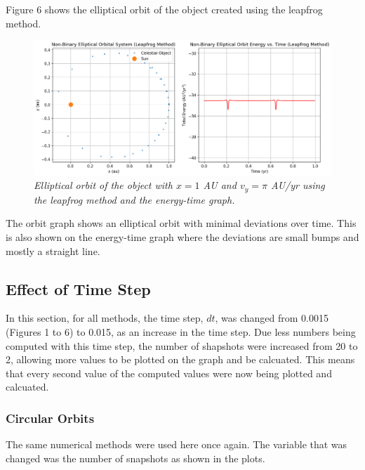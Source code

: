 \documentclass[11 pt, a4paper]{article}
\begin{document}
Figure 6 shows the elliptical orbit of the object created using the leapfrog method.
\begin{figure}[H]
  \includegraphics[width=1\linewidth]{Leapfrog/leapfrogelliptic.png}
  \centering
  \caption{\textit{Elliptical orbit of the object with $x = 1$ AU and $v_y = \pi$ AU/yr using the leapfrog method and the energy-time graph.}} 
\end{figure}
The orbit graph shows an elliptical orbit with minimal deviations over time. This is also shown on the energy-time graph where the deviations are small bumps
and mostly a straight line.

\subsection{Effect of Time Step}
In this section, for all methods, the time step, $dt$, was changed from 0.0015 (Figures 1 to 6) to 0.015, as an increase in the time step. Due less numbers being computed with this time step, 
the number of shapshots were increased from 20 to 2, allowing more values to be plotted on the graph and be calcuated. This means that every second value of the computed values were now being plotted and calcuated.

\subsubsection{Circular Orbits}
The same numerical methods were used here once again. The variable that was changed was the number of snapshots as shown in the plots.
\end{document}
